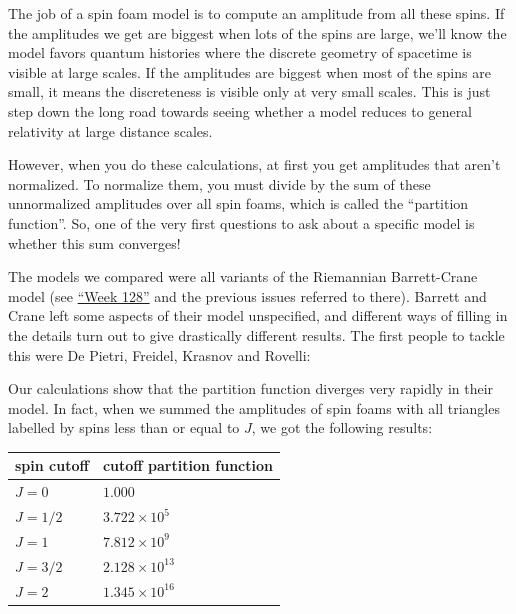 \documentclass{article}
\def\tightlist{}
\renewcommand{\texttt}[1]{%
  \begingroup
  \ttfamily
  \begingroup\lccode`~=`/\lowercase{\endgroup\def~}{/\discretionary{}{}{}}%
  \begingroup\lccode`~=`[\lowercase{\endgroup\def~}{[\discretionary{}{}{}}%
  \begingroup\lccode`~=`.\lowercase{\endgroup\def~}{.\discretionary{}{}{}}%
  \catcode`/=\active\catcode`[=\active\catcode`.=\active
  \scantokens{#1\noexpand}%
  \endgroup
}
\begin{document}
The job of a spin foam model is to compute an amplitude from all these
spins. If the amplitudes we get are biggest when lots of the spins are
large, we'll know the model favors quantum histories where the discrete
geometry of spacetime is visible at large scales. If the amplitudes are
biggest when most of the spins are small, it means the discreteness is
visible only at very small scales. This is just step down the long road
towards seeing whether a model reduces to general relativity at large
distance scales.

However, when you do these calculations, at first you get amplitudes
that aren't normalized. To normalize them, you must divide by the sum of
these unnormalized amplitudes over all spin foams, which is called the
``partition function''. So, one of the very first questions to ask about
a specific model is whether this sum converges!

The models we compared were all variants of the Riemannian Barrett-Crane
model (see \protect\hyperlink{week128}{``Week 128''} and the previous
issues referred to there). Barrett and Crane left some aspects of their
model unspecified, and different ways of filling in the details turn out
to give drastically different results. The first people to tackle this
were De Pietri, Freidel, Krasnov and Rovelli:


Our calculations show that the partition function diverges very rapidly
in their model. In fact, when we summed the amplitudes of spin foams
with all triangles labelled by spins less than or equal to \(J\), we got
the following results:

\begin{longtable}[]{@{}ll@{}}
\toprule
spin cutoff & cutoff partition function\tabularnewline
\midrule
\endhead
\(J = 0\) & \(1.000\)\tabularnewline
\(J = 1/2\) & \(3.722\times 10^5\)\tabularnewline
\(J = 1\) & \(7.812\times 10^9\)\tabularnewline
\(J = 3/2\) & \(2.128\times 10^{13}\)\tabularnewline
\(J = 2\) & \(1.345\times 10^{16}\)\tabularnewline
\bottomrule
\end{longtable}
\end{document}
